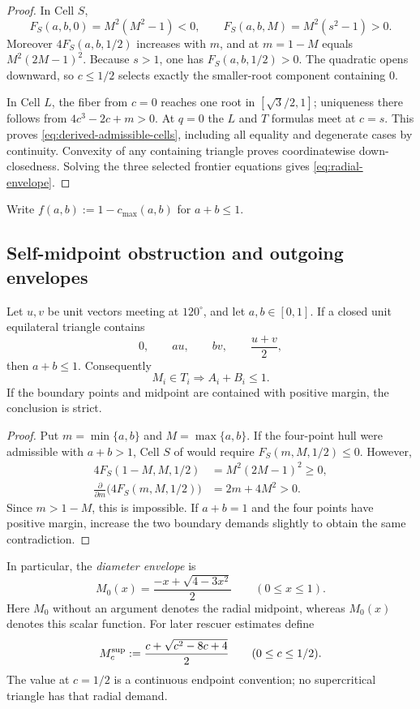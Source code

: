 \begin{proof}
In Cell $S$,
\[
 F_S(a,b,0)=M^2(M^2-1)<0,
 \qquad F_S(a,b,M)=M^2(s^2-1)>0.
\]
Moreover $4F_S(a,b,1/2)$ increases with $m$, and at $m=1-M$ equals
$M^2(2M-1)^2$.  Because $s>1$, one has $F_S(a,b,1/2)>0$.  The quadratic
opens downward, so $c\le1/2$ selects exactly the smaller-root component
containing $0$.

In Cell $L$, the fiber from $c=0$ reaches one root in
$[\sqrt3/2,1]$; uniqueness there follows from
$4c^3-2c+m>0$.  At $q=0$ the $L$ and $T$ formulas meet at $c=s$.
This proves \eqref{eq:derived-admissible-cells}, including all equality and
degenerate cases by continuity.  Convexity of any containing triangle proves
coordinatewise down-closedness.  Solving the three selected frontier
equations gives \eqref{eq:radial-envelope}.
\end{proof}


Write $f(a,b):=1-c_{\max}(a,b)$ for $a+b\le1$.

\subsection{Self-midpoint obstruction and outgoing envelopes}

\begin{lemma}
\label{lem:self-midpoint}
\label{lem:app-self-midpoint-caliper}

Let $u,v$ be unit vectors meeting at $120^\circ$, and let $a,b\in[0,1]$.
If a closed unit
equilateral triangle contains
\[
 0,\qquad au,\qquad bv,\qquad\frac{u+v}{2},
\]
then $a+b\le1$.  Consequently
\[
 M_i\in T_i\Longrightarrow A_i+B_i\le1.
\]
If the boundary points and midpoint are contained with positive margin, the
conclusion is strict.
\end{lemma}
\begin{proof}
Put $m=\min\{a,b\}$ and $M=\max\{a,b\}$. If the four-point hull
were admissible with $a+b>1$, Cell $S$ of
 would require $F_S(m,M,1/2)\le0$.
However,
\[
\begin{aligned}
 4F_S(1-M,M,1/2)&=M^2(2M-1)^2\ge0,\\
 \frac{\partial}{\partial m}\bigl(4F_S(m,M,1/2)\bigr)&=2m+4M^2>0.
\end{aligned}
\]
Since $m>1-M$, this is impossible. If $a+b=1$ and the four points
have positive margin, increase the two boundary demands slightly to
obtain the same contradiction.
\end{proof}

In particular, the \emph{diameter envelope} is
\begin{equation}
 M_0(x)=\frac{-x+\sqrt{4-3x^2}}2\qquad(0\le x\le1).
 \label{eq:diameter-envelope-definition}
\end{equation}
Here $M_0$ without an argument denotes the radial midpoint, whereas
$M_0(x)$ denotes this scalar function. For later rescuer estimates define
\begin{equation}
 M_c^{\rm sup}:=\frac{c+\sqrt{c^2-8c+4}}2\qquad(0\le c\le1/2).
 \label{eq:supercritical-envelope-definition}
\end{equation}
The value at $c=1/2$ is a continuous endpoint convention; no
supercritical triangle has that radial demand.


